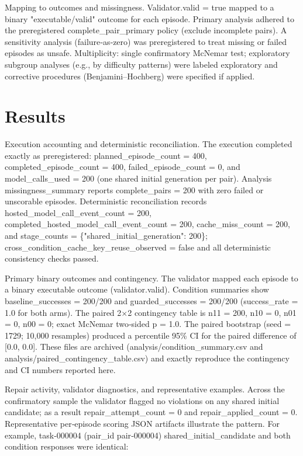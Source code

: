 \documentclass[conference]{IEEEtran}
\begin{document}
Mapping to outcomes and missingness. Validator.valid = true mapped to a binary "executable/valid" outcome for each episode. Primary analysis adhered to the preregistered complete\_pair\_primary policy (exclude incomplete pairs). A sensitivity analysis (failure‑as‑zero) was preregistered to treat missing or failed episodes as unsafe. Multiplicity: single confirmatory McNemar test; exploratory subgroup analyses (e.g., by difficulty patterns) were labeled exploratory and corrective procedures (Benjamini--Hochberg) were specified if applied.

\section{Results}
Execution accounting and deterministic reconciliation. The execution completed exactly as preregistered: planned\_episode\_count = 400, completed\_episode\_count = 400, failed\_episode\_count = 0, and model\_calls\_used = 200 (one shared initial generation per pair). Analysis missingness\_summary reports complete\_pairs = 200 with zero failed or unscorable episodes. Deterministic reconciliation records hosted\_model\_call\_event\_count = 200, completed\_hosted\_model\_call\_event\_count = 200, cache\_miss\_count = 200, and stage\_counts = \{"shared\_initial\_generation": 200\}; cross\_condition\_cache\_key\_reuse\_observed = false and all deterministic consistency checks passed.

Primary binary outcomes and contingency. The validator mapped each episode to a binary executable outcome (validator.valid). Condition summaries show baseline\_successes = 200/200 and guarded\_successes = 200/200 (success\_rate = 1.0 for both arms). The paired 2\ensuremath{\times}2 contingency table is n11 = 200, n10 = 0, n01 = 0, n00 = 0; exact McNemar two‑sided p = 1.0. The paired bootstrap (seed = 1729; 10,000 resamples) produced a percentile 95\% CI for the paired difference of [0.0, 0.0]. These files are archived (analysis/condition\_summary.csv and analysis/paired\_contingency\_table.csv) and exactly reproduce the contingency and CI numbers reported here.

Repair activity, validator diagnostics, and representative examples. Across the confirmatory sample the validator flagged no violations on any shared initial candidate; as a result repair\_attempt\_count = 0 and repair\_applied\_count = 0. Representative per‑episode scoring JSON artifacts illustrate the pattern. For example, task‑000004 (pair\_id pair‑000004) shared\_initial\_candidate and both condition responses were identical:
\end{document}
